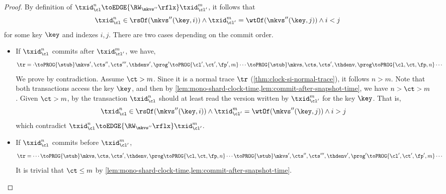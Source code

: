 \begin{proof}
    By definition of \( \txid_\cl^n \toEDGE{\RW_{\mkvs''}\rflx} \txid_{\cl'}^m \),
    it follows that
    \[
        \txid_\cl^n \in \rsOf(\mkvs''(\key,i)) 
        \land \txid_{\cl'}^m = \wtOf(\mkvs''(\key,j)) 
        \land i < j
    \]                              
    for some key \( \key \) and indexes \( i,j \).
    There are two cases depending on the commit order.
    \begin{itemize}
        \item If \( \txid_\cl^n \) commits after \( \txid_{\cl'}^m  \),
            we have,
            \[
                \begin{array}{@{}l@{}}
                \tr = \cdot \toPROG{\stub} \mkvs',\cts'',\cts''',\thdenv', \prog' \toPROG{\cl',\ct',\fp',m} \cdots
                \toPROG{\stub} \mkvs,\cts,\cts',\thdenv, \prog \toPROG{\cl,\ct,\fp,n} \cdots \\
                \end{array}
            \]
            We prove by contradiction.
            Assume \( \ct > m \).
            Since it is a normal trace \( \tr \) (\cref{thm:clock-si-normal-trace}), 
            it follows \( n > m \).
            Note that both transactions access the key \( \key \), and then by \cref{lem:mono-shard-clock-time,lem:commit-after-snapshot-time}, we have \( n > \ct > m  \).
            Given \( \ct > m \), by  the transaction \( \txid_\cl^n \) should at least read the version written by \( \txid_{\cl'}^m \) for the key \( \key \).
            That is,
            \[
                \txid_\cl^n \in \rsOf(\mkvs''(\key,i)) 
                \land \txid_{\cl'}^m = \wtOf(\mkvs''(\key,j)) 
                \land i > j
            \]
            which contradict  \( \txid_\cl^n \toEDGE{\RW_{\mkvs''}\rflx} \txid_{\cl'}^m  \).
        \item If \( \txid_\cl^n \) commits before \( \txid_{\cl'}^m  \),
            \[
                \begin{array}{@{}l@{}}
                    \tr = \cdots \toPROG{\stub} \mkvs,\cts,\cts',\thdenv, \prog \toPROG{\cl,\ct,\fp,n} \cdots
                    \toPROG{\stub} \mkvs',\cts'',\cts''',\thdenv', \prog' \toPROG{\cl',\ct',\fp',m} \cdots
                \end{array}
            \]
            It is trivial that \( \ct \leq m \) by \cref{lem:mono-shard-clock-time,lem:commit-after-snapshot-time}.
    \end{itemize}
\end{proof}

